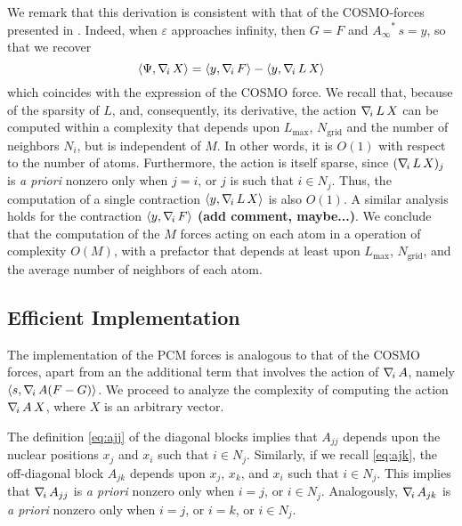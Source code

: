 We remark that this derivation is consistent with that of the COSMO-forces presented in \cite{Lipparini_JCTC_ddCOSMO}. Indeed, when $\varepsilon$ approaches infinity, then $G = F$ and ${A_\infty}^* \, s =y$, so that we recover
\[
\langle \Psi , \nabla_{\!i}\, X\rangle =  \langle y , \nabla_{\!i}\, F \rangle - \langle y , \nabla_{\!i}\, L \,  X \rangle
\]
which coincides with the expression of the COSMO force. We recall that, because of the sparsity of $L$, and, consequently, its derivative, the action $\nabla_{\!i}\, L \, X$ can be computed within a complexity that depends upon $L_\text{max}$, $N_\text{grid}$ and the number of neighbors $N_i$, but is independent of $M$. In other words, it is $O(1)$ with respect to the number of atoms. Furthermore, the action is itself sparse, since $(\nabla_{\!i}\, L \, X)_j$ is \emph{a priori} nonzero only when $j = i$, or $j$ is such that $i \in N_j$. Thus, the computation of a single contraction $\langle y , \nabla_{\!i}\, L \,  X \rangle$ is also $O(1)$. A similar analysis holds for the contraction $\langle y , \nabla_{\!i}\, F \rangle$ {\bf (add comment, maybe...)}. We conclude that the computation of the $M$ forces acting on each atom in a operation of complexity $O(M)$, with a prefactor that depends at least upon $L_\text{max}$, $N_\text{grid}$, and the average number of neighbors of each atom.

\subsection{Efficient Implementation}

The implementation of the PCM forces is analogous to that of the COSMO forces, apart from an the additional term that involves the action of $\nabla_{\!i}\, A$, namely $\langle s , \nabla_{\!i}\,  A ( F - G ) \rangle$. We proceed to analyze the complexity of computing the action $\nabla_{\!i}\, A \, X$, where $X$ is an arbitrary vector.

The definition \eqref{eq:ajj} of the diagonal blocks implies that $A_{jj}$ depends upon the nuclear positions $x_j$ and $x_i$ such that $i \in N_j$. Similarly, if we recall \eqref{eq:ajk}, the off-diagonal block $A_{jk}$ depends upon $x_j$, $x_k$, and $x_i$ such that $i \in N_j$. This implies that $\nabla_{\!i}\, A_{jj}$ is \emph{a priori} nonzero only when $i = j$, or $i \in N_j$. Analogously, $\nabla_{\!i}\, A_{jk}$ is \emph{a priori} nonzero only when $i = j$, or $i = k$, or $i \in N_j$.

